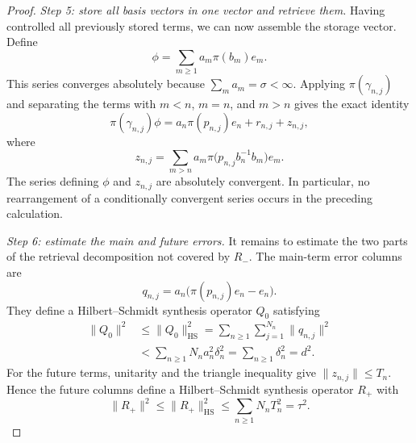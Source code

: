 \documentclass[reqno]{amsart}
\numberwithin{equation}{section}
\theoremstyle{definition}
\theoremstyle{remark}
\newcommand{\HS}{\mathrm{HS}}
\newcommand{\Step}[1]{\par\medskip\noindent\textit{#1.}\quad}
\begin{document}
\begin{proof}
\Step{Step 5: store all basis vectors in one vector and retrieve them}
Having controlled all previously stored terms, we can now assemble the
storage vector.  Define
\begin{equation}\label{eq:storage-vector}
 \phi=\sum_{m\geq1}a_m\pi(b_m)e_m.
\end{equation}
This series converges absolutely because $\sum_ma_m=\sigma<\infty$.  Applying
$\pi(\gamma_{n,j})$ and separating the terms with $m<n$, $m=n$, and $m>n$
gives the exact identity
\begin{equation}\label{eq:retrieval-decomposition}
 \pi(\gamma_{n,j})\phi
 =a_n\pi(p_{n,j})e_n+r_{n,j}+z_{n,j},
\end{equation}
where
\begin{equation}\label{eq:future-column}
 z_{n,j}
 =\sum_{m>n}a_m
   \pi\bigl(p_{n,j}b_n^{-1}b_m\bigr)e_m.
\end{equation}
The series defining $\phi$ and $z_{n,j}$ are absolutely convergent.  In
particular, no rearrangement of a conditionally convergent series occurs in
the preceding calculation.

\Step{Step 6: estimate the main and future errors}
It remains to estimate the two parts of the retrieval decomposition not
covered by $R_-$.  The main-term error columns are
\[
 q_{n,j}=a_n\bigl(\pi(p_{n,j})e_n-e_n\bigr).
\]
They define a Hilbert--Schmidt synthesis operator $Q_0$ satisfying
\begin{equation}\label{eq:main-error-bound}
\begin{aligned}
 \|Q_0\|^2
 &\leq\|Q_0\|_{\HS}^2
   =\sum_{n\geq1}\sum_{j=1}^{N_n}\|q_{n,j}\|^2 \\
 &<\sum_{n\geq1}N_na_n^2\delta_n^2
   =\sum_{n\geq1}\delta_n^2=d^2.
\end{aligned}
\end{equation}
For the future terms, unitarity and the triangle inequality give
$\|z_{n,j}\|\leq T_n$.  Hence
the future columns define a Hilbert--Schmidt synthesis operator $R_+$ with
\begin{equation}\label{eq:future-error-bound}
 \|R_+\|^2
 \leq\|R_+\|_{\HS}^2
 \leq\sum_{n\geq1}N_nT_n^2=\tau^2.
\end{equation}


\end{proof}
\end{document}
